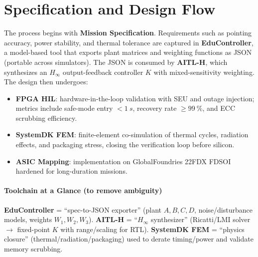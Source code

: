 \documentclass[conference]{IEEEtran}
\begin{document}
\section{Specification and Design Flow}
The process begins with \textbf{Mission Specification}. Requirements such as pointing accuracy, power stability, and thermal tolerance are captured in \textbf{EduController}, a model-based tool that exports plant matrices and weighting functions as JSON (portable across simulators). The JSON is consumed by \textbf{AITL-H}, which synthesizes an $H_\infty$ output-feedback controller $K$ with mixed-sensitivity weighting. The design then undergoes:
\begin{itemize}
  \item \textbf{FPGA HIL}: hardware-in-the-loop validation with SEU and outage injection; metrics include safe-mode entry $<\SI{1}{s}$, recovery rate $\ge\SI{99}{\percent}$, and ECC scrubbing efficiency.
  \item \textbf{SystemDK FEM}: finite-element co-simulation of thermal cycles, radiation effects, and packaging stress, closing the verification loop before silicon.
  \item \textbf{ASIC Mapping}: implementation on GlobalFoundries 22FDX FD\!SOI hardened for long-duration missions.
\end{itemize}

\paragraph*{Toolchain at a Glance (to remove ambiguity)}
\textbf{EduController} = “spec-to-JSON exporter” (plant $A,B,C,D$, noise/disturbance models, weights $W_1,W_2,W_3$). 
\textbf{AITL-H} = “$H_\infty$ synthesizer” (Ricatti/LMI solver $\rightarrow$ fixed-point $K$ with range/scaling for RTL). 
\textbf{SystemDK FEM} = “physics closure” (thermal/radiation/packaging) used to derate timing/power and validate memory scrubbing.
\end{document}
